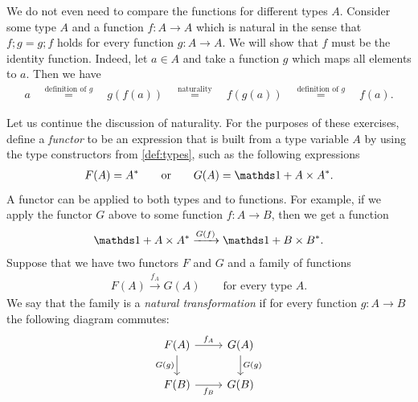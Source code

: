 {
    We do not even need to compare the functions for different types $A$. Consider some type $A$  and a function $f : A\to A$ 
    which is natural in the sense that $f;g = g;f$ holds for every function $g : A \to A$. We will show that $f$ must be the identity function. Indeed, let $a \in A$ and take a function $g$ which maps all elements to $a$. Then we have 
    \begin{align*}
       a \quad  \stackrel{\text{definition of $g$}} = \quad    
       g(f(a))
       \quad  \stackrel{\text{naturality}} = \quad 
        f(g(a)) 
      \quad  \stackrel{\text{definition of $g$}} = \quad   
        f(a) .
    \end{align*}
}

Let us continue the discussion of naturality. For the purposes of these exercises, define a \emph{functor} to be an expression  that is built from a type variable $A$ by using the type constructors from \cref{def:types}, such as the following expressions \begin{align*}
F(A) = A^* \qquad \text{or} \qquad   G(A) =  \onetype + A \times A^*.
\end{align*}
A functor can be applied to both types and to functions. For example, if we apply the functor $G$ above to some function $f : A \to B$, then we get a function
\begin{align*}
    \onetype + A \times A^* \xrightarrow {G(f)} \onetype + B \times B^*.
\end{align*}
Suppose that we have two functors $F$ and $G$ and a family of functions 
\begin{align*}
F(A) \xrightarrow {f_A} G(A) \qquad \text{for every type $A$}.
\end{align*}
We say that the family is a \emph{natural transformation} if for every function $g : A \to B$ the following diagram commutes:
\[
\begin{tikzcd}[ampersand replacement=\&]
F(A) \arrow[r, "f_A"] \arrow[d, "G(g)"'] \& G(A) \arrow[d, "G(g)"] \\
F(B) \arrow[r, "f_B"'] \& G(B)
\end{tikzcd}
\]



